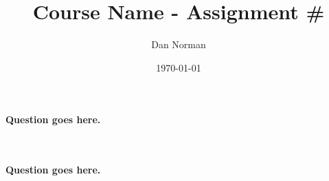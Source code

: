 \documentclass{article}
\title{Course Name - Assignment \#}
\author{Dan Norman}
\date{\today}
\begin{document}
\maketitle


\section{}

\textbf{Question goes here.}


\begin{equation}
\end{equation}


\section{}

\textbf{Question goes here.}


\begin{equation}
\end{equation}
\end{document}
